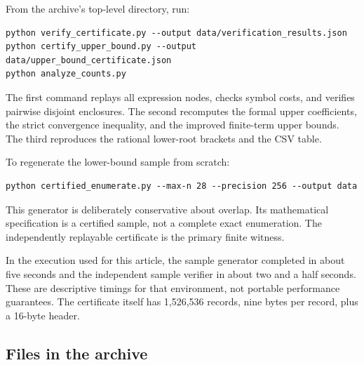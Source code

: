 \documentclass[11pt,letterpaper]{article}
\numberwithin{equation}{section}
\theoremstyle{definition}
\begin{document}
From the archive's top-level directory, run:
\begin{lstlisting}
python verify_certificate.py --output data/verification_results.json
python certify_upper_bound.py --output data/upper_bound_certificate.json
python analyze_counts.py
\end{lstlisting}
The first command replays all expression nodes, checks symbol costs, and
verifies pairwise disjoint enclosures. The second recomputes the formal upper
coefficients, the strict convergence inequality, and the improved finite-term
upper bounds. The third reproduces the rational lower-root brackets and the
CSV table.

To regenerate the lower-bound sample from scratch:
\begin{lstlisting}
python certified_enumerate.py --max-n 28 --precision 256 --output data
\end{lstlisting}
This generator is deliberately conservative about overlap. Its mathematical
specification is a certified sample, not a complete exact enumeration.
The independently replayable certificate is the primary finite witness.

In the execution used for this article, the sample generator completed in
about five seconds and the independent sample verifier in about two and a
half seconds. These are descriptive timings for that environment, not
portable performance guarantees. The certificate itself has 1,526,536
records, nine bytes per record, plus a 16-byte header.

\subsection*{Files in the archive}
\end{document}
